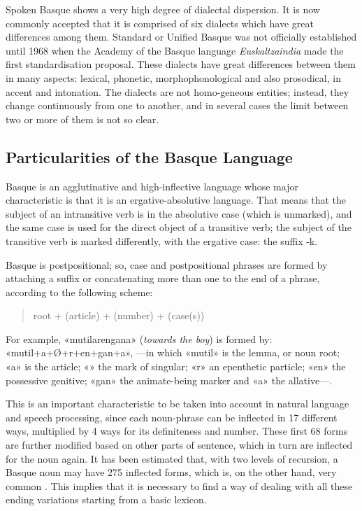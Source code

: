 \begin{multicols}{2}

Spoken Basque shows a very high degree of dialectal dispersion. It is now commonly accepted that it is comprised of six dialects which have great differences among them. Standard or Unified Basque was not officially established until 1968 when the Academy of the Basque language\textit{ Euskaltzaindia} \cite{BAS-Nota7}  made the first standardisation proposal. These dialects have great differences between them in many aspects: lexical, phonetic, morphophonological and also prosodical, in accent and intonation. The dialects are not homo-geneous entities; instead, they change continuously from one to another, and in several cases the limit between two or more of them is not so clear.

\subsection{Particularities of the Basque Language}
   Basque is an agglutinative and high-inflective language whose major characteristic is that it is an ergative-absolutive language. That means that the subject of an intransitive verb is in the absolutive case (which is unmarked), and the same case is used for the direct object of a transitive verb; the subject of the transitive verb is marked differently, with the ergative case: the suffix -k.


Basque is postpositional; so, case and postpositional phrases are formed by attaching a suffix or concatenating more than one to the end of a phrase, according to the following scheme:

\begin{quote}
root + (article) + (number) + (case(s))
\end{quote}

For example, «mutilarengana» (\textit{towards the boy}) is formed by: «mutil+a+Ø+r\-+en+gan+a», —in which «mutil» is the lemma, or noun root; «a» is the article; «» the mark of singular; «r» an epenthetic particle; «en» the possessive genitive; «gan» the animate-being marker and «a» the allative—.

This is an important characteristic to be taken into account in natural language and speech processing, since each noun-phrase can be inflected in 17 different ways, multiplied by 4 ways for its definiteness and number. These first 68 forms are further modified based on other parts of sentence, which in turn are inflected for the noun again. It has been estimated that, with two levels of recursion, a Basque noun may have 275 inflected forms, which is, on the other hand, very common \cite{BAS-Nota8}. This implies that it is necessary to find a way of dealing with all these ending variations starting from a basic lexicon. 


\end{multicols}
